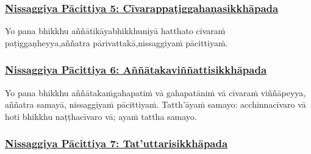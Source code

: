 \subsubsection*{\hyperref[forf-exp5]{Nissaggiya Pācittiya 5: Cīvarappaṭiggahaṇasikkhāpada}}
\label{np5}

Yo pana bhikkhu aññātikāya\makeatletter\hyperlink{endnote131-appendix}\makeatother \thinspace bhikkhuniyā hatthato cīvaraṁ paṭiggaṇheyya,\makeatletter\hyperlink{endnote132-appendix}\makeatother \thinspace aññatra pārivattakā,\makeatletter\hyperlink{endnote133-appendix}\makeatother \thinspace nissaggiyaṁ pācittiyaṁ.



\subsubsection*{\hyperref[forf-exp6]{Nissaggiya Pācittiya 6: Aññātakaviññattisikkhāpada}}
\label{np6}

Yo pana bhikkhu aññātakaṁ\makeatletter\hyperlink{endnote134-appendix}\makeatother \thinspace gahapatiṁ vā gahapatāniṁ vā cīvaraṁ viññāpeyya, aññatra samayā, nissaggiyaṁ pācittiyaṁ. Tatth'āyaṁ samayo: acchinnacīvaro vā hoti bhikkhu naṭṭhacīvaro vā; ayaṁ tattha samayo.



\subsubsection*{\hyperref[forf-exp7]{Nissaggiya Pācittiya 7: Tat'uttarisikkhāpada}}
\label{np7}

